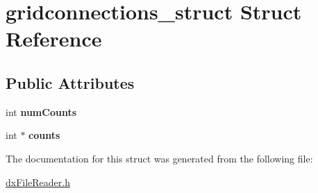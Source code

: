 \hypertarget{structgridconnections__struct}{
\section{gridconnections\_\-struct Struct Reference}
\label{structgridconnections__struct}
}
\subsection*{Public Attributes}
\begin{DoxyCompactItemize}
\item 
\hypertarget{structgridconnections__struct_a34ea5aab36db1459d0fed61dbf0d4565}{
int {\bfseries numCounts}}
\label{structgridconnections__struct_a34ea5aab36db1459d0fed61dbf0d4565}

\item 
\hypertarget{structgridconnections__struct_acdd8828ec857c14ca0461266bbd69dad}{
int $\ast$ {\bfseries counts}}
\label{structgridconnections__struct_acdd8828ec857c14ca0461266bbd69dad}

\end{DoxyCompactItemize}


The documentation for this struct was generated from the following file:\begin{DoxyCompactItemize}
\item 
\hyperlink{dxFileReader_8h}{dxFileReader.h}\end{DoxyCompactItemize}
